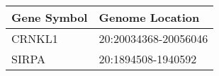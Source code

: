 \begin{tabular}{ll}
\toprule
Gene Symbol &      Genome Location \\
\midrule
     CRNKL1 & 20:20034368-20056046 \\
      SIRPA &   20:1894508-1940592 \\
\bottomrule
\end{tabular}
